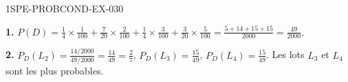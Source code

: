 \begin{corrige}{1SPE-PROBCOND-EX-030}

\textbf{1.} $P(D) = \frac{1}{4}\times\frac{1}{100} + \frac{7}{20}\times\frac{2}{100} + \frac{1}{4}\times\frac{3}{100} + \frac{3}{20}\times\frac{5}{100} = \frac{5+14+15+15}{2000} = \frac{49}{2000}$.

\textbf{2.} $P_D(L_2) = \frac{14/2000}{49/2000} = \frac{14}{49} = \frac{2}{7}$, $P_D(L_3) = \frac{15}{49}$, $P_D(L_4) = \frac{15}{49}$. Les lots $L_3$ et $L_4$ sont les plus probables.

\end{corrige}
